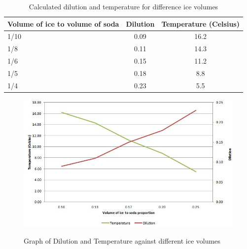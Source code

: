 \documentclass[oneside,12pt]{report}
\begin{document}
\newpage


\begin{table}[ h]
\centering
\begin{tabular}{ l || c|c}
 Volume of ice to volume of soda &Dilution &Temperature (Celsius) \\
\hline  
1/10 & 0.09&16.2\\ 
\hline  
1/8 & 0.11&14.3\\ 
\hline 
1/6 & 0.15&11.2\\ 
\hline 
1/5 & 0.18&8.8\\ 
\hline 
1/4 & 0.23&5.5\\ 
\hline    
\end{tabular}
\caption{Calculated dilution and temperature for difference ice volumes}
\label{DilTempTable}
\end{table}

\begin{figure}
	\centering
	\caption{Graph of Dilution and Temperature against different ice volumes}
	\includegraphics[width=\textwidth]{extra/Graph.jpg}
\label{DilTempGraph}
\end{figure}

\vspace{12pt}
\end{document}
